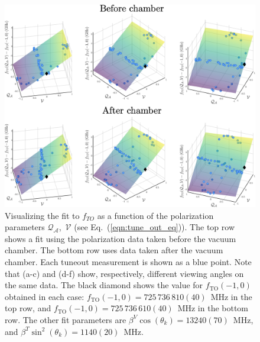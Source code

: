	\begin{figure}
	    \centering
	    \includegraphics[width=\textwidth]{fig/tuneout/polz_pre_post}
	\caption{Visualizing the fit to $f_{TO}$ as a function of the polarization parameters $\mathcal{Q_{A}}$,\, $\mathcal{V}$  (see Eq.~(\ref{eqn:tune_out_eq})). The top row shows a fit using the polarization data taken before the vacuum chamber. The bottom row uses data taken after the vacuum chamber.  Each tuneout measurement is shown as a blue point. Note that (a-c) and (d-f) show, respectively, different viewing angles on the same data. The black diamond shows the value for \(f_{\mathrm{TO}}(-1,0)\) obtained in each case: \(f_{\mathrm{TO}}(-1,0)=725\, 736\, 810(40)\)~MHz in the top row, and \(f_{\mathrm{TO}}(-1,0)=725\, 736\, 610(40)\)~MHz in the bottom row. The other fit parameters are \(\beta^V \cos(\theta_k)=13240(70)\)~MHz, and \(\beta^T \sin^2(\theta_k)=1140(20)\)~MHz.}
	\label{fig:full_tune_out}
	\end{figure}
	
